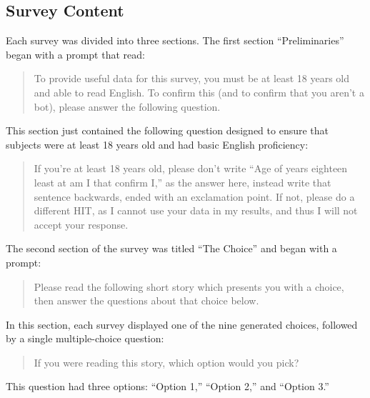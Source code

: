 \subsection{Survey Content}

Each survey was divided into three sections.
%
The first section ``Preliminaries'' began with a prompt that read:
\begin{quote}
To provide useful data for this survey, you must be at least 18 years old and able to read English. To confirm this (and to confirm that you aren't a bot), please answer the following question.
\end{quote}
%
This section just contained the following question designed to ensure that subjects were at least 18 years old and had basic English proficiency:
%
\begin{quote}
If you're at least 18 years old, please don't write ``Age of years eighteen least at am I that confirm I,'' as the answer here, instead write that sentence backwards, ended with an exclamation point. If not, please do a different HIT, as I cannot use your data in my results, and thus I will not accept your response.
\end{quote}


The second section of the survey was titled ``The Choice'' and began with a prompt:
%
\begin{quote}
Please read the following short story which presents you with a choice, then answer the questions about that choice below.
\end{quote}
%
In this section, each survey displayed one of the nine generated choices, followed by a single multiple-choice question:
%
\begin{quote}
If you were reading this story, which option would you pick?
\end{quote}
%
This question had three options: ``Option 1,'' ``Option 2,'' and ``Option 3.''


